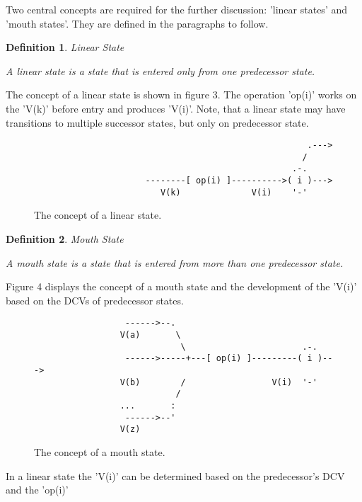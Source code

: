 \documentclass[12pt,a4paper]{scrartcl}
\theoremstyle{break}
\newtheorem{definition}{Definition}
\begin{document}
Two central concepts are required for the further discussion: 'linear states' and 'mouth
states'.  They are defined in the paragraphs to follow. 

\begin{definition}
Linear State

A linear state is a state that is entered only from one predecessor state.
\end{definition}

The concept of a linear state is shown in figure 3. The operation 'op(i)' works
on the 'V(k)' before entry and produces 'V(i)'. Note, that a linear state
may have transitions to multiple successor states, but only on predecessor state.

\begin{figure}[htbp] \leavevmode
\begin{verbatim}
                                                      .---> 
                                                     /
                                                   .-.
                      --------[ op(i) ]---------->( i )---> 
                         V(k)              V(i)    '-'

\end{verbatim}
\caption{The concept of a linear state.}
\end{figure}

\begin{definition}
Mouth State

A mouth state is a state that is entered from more than one predecessor 
state. 
\end{definition}
    
Figure 4 displays the concept of a mouth state and the development of the
'V(i)' based on the DCVs of predecessor states.

\begin{figure}[htbp] \leavevmode
\begin{verbatim}
                  ------>--.  
                 V(a)       \ 
                             \                       .-.
                  ------>-----+---[ op(i) ]---------( i )---> 
                 V(b)        /                 V(i)  '-'
                            /
                 ...       :
                  ------>--'
                 V(z)

\end{verbatim}
\caption{The concept of a mouth state.}
\end{figure}

In a linear state the 'V(i)' can be determined based on the predecessor's
DCV and the 'op(i)'
\end{document}

